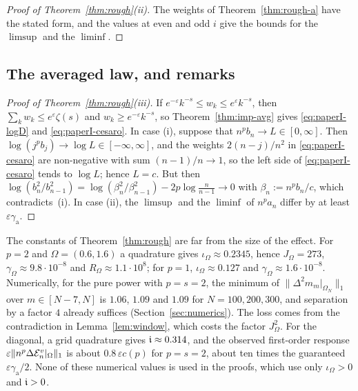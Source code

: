 \begin{proof}[Proof of Theorem~\ref{thm:rough}\textup{(ii)}]
The weights of Theorem~\ref{thm:rough-a} have the stated form, and the values at even and odd $i$ give the bounds for
the $\limsup$ and the $\liminf$.
\end{proof}

\subsection{The averaged law, and remarks}\label{sec:rough-rest}

\begin{proof}[Proof of Theorem~\ref{thm:rough}\textup{(iii)}]
If $e^{-\varepsilon}k^{-s}\le w_k\le e^{\varepsilon}k^{-s}$, then $\sum_kw_k\le e^\varepsilon\zeta(s)$ and $w_k\ge
e^{-\varepsilon}k^{-s}$, so Theorem~\ref{thm:imp-avg} gives \eqref{eq:paperI-logD} and \eqref{eq:paperI-cesaro}. In
case (i), suppose that $n^pb_n\to L\in[0,\infty]$. Then $\log(j^pb_j)\to\log L\in[-\infty,\infty]$, and the weights
$2(n-j)/n^2$ in \eqref{eq:paperI-cesaro} are non-negative with sum $(n-1)/n\to1$, so the left side of
\eqref{eq:paperI-cesaro} tends to $\log L$; hence $L=c$. But then $\log(b_n^2/b_{n-1}^2)=\log(\beta_n^2/\beta_{n-1}^2)
-2p\log\frac n{n-1}\to0$ with $\beta_n:=n^pb_n/c$, which contradicts~(i). In case (ii), the $\limsup$ and the
$\liminf$ of $n^pa_n$ differ by at least $\varepsilon\gamma_{\mathrm a}$.
\end{proof}

\begin{remark}\label{rem:constants}
The constants of Theorem~\ref{thm:rough} are far from the size of the effect. For $p=2$ and $\Omega=(0.6,1.6)$ a quadrature
gives $\iota_\Omega\approx0.2345$, hence $J_\Omega=273$, $\gamma_\Omega\approx9.8\cdot10^{-8}$ and $R_\Omega\approx1.1\cdot10^8$; for
$p=1$, $\iota_\Omega\approx0.127$ and $\gamma_\Omega\approx1.6\cdot10^{-8}$. Numerically, for the pure power with $p=s=2$, the
minimum of $\|\Delta^2m_m|_{\Omega_N}\|_1$ over $m\in[N-7,N]$ is $1.06$, $1.09$ and $1.09$ for $N=100,200,300$, and
separation by a factor $4$ already suffices (Section~\ref{sec:numerics}). The loss comes from the contradiction in
Lemma~\ref{lem:window}, which costs the factor $J_\Omega^2$. For the diagonal, a grid quadrature gives $\mathfrak{i}\approx0.314$,
and the observed first-order response $\varepsilon\|n^p\Delta\mathcal{E}_n^v|_\Omega\|_1$ is about $0.8\,\varepsilon c(p)$ for $p=s=2$,
about ten times the guaranteed $\varepsilon\gamma_{\mathrm a}/2$. None of these numerical values is used in the proofs,
which use only $\iota_\Omega>0$ and $\mathfrak{i}>0$.
\end{remark}

